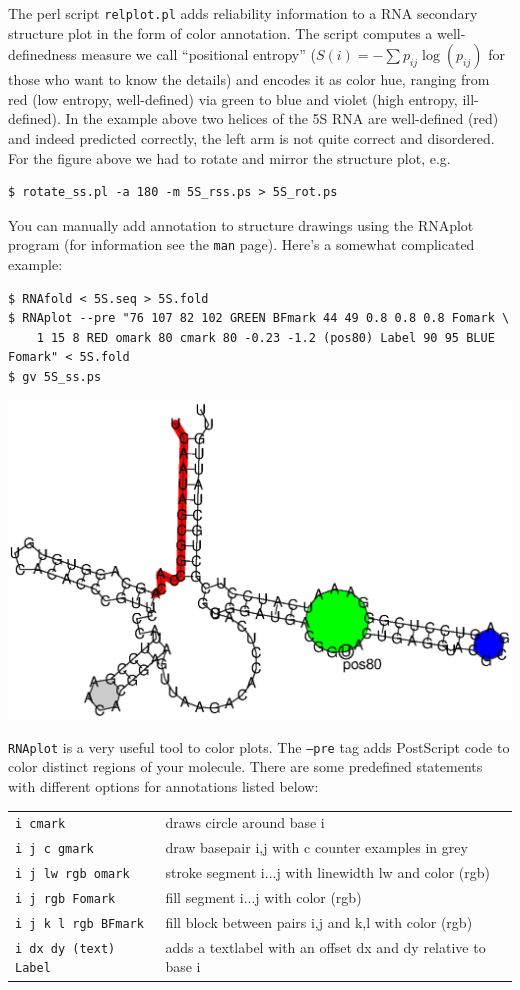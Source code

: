 \documentclass[a4paper]{article}
\begin{document}
The perl script \texttt{relplot.pl} adds reliability
information to a RNA secondary structure plot in the form of color
annotation. The script computes a well-definedness measure we call
``positional entropy'' ($S(i) = -\sum p_{ij}\log(p_{ij})$ for those who
want to know the details) and encodes it as color hue, ranging from red
(low entropy, well-defined) via green to blue and violet (high
entropy, ill-defined). In the example above two helices of the 5S RNA are
well-defined (red) and indeed predicted correctly, the left arm is not quite
correct and disordered.\\
\noindent
For the figure above we had to rotate and mirror the structure plot, e.g.
\begin{verbatim}
$ rotate_ss.pl -a 180 -m 5S_rss.ps > 5S_rot.ps
\end{verbatim}%
\noindent
You can manually add annotation to structure drawings using the RNAplot
program (for information see the \texttt{man} page). Here's a somewhat complicated example:

\begin{verbatim}
$ RNAfold < 5S.seq > 5S.fold
$ RNAplot --pre "76 107 82 102 GREEN BFmark 44 49 0.8 0.8 0.8 Fomark \
    1 15 8 RED omark 80 cmark 80 -0.23 -1.2 (pos80) Label 90 95 BLUE Fomark" < 5S.fold
$ gv 5S_ss.ps
\end{verbatim}%
\begin{center}
\includegraphics[width=.75\textwidth]{Figures/5S_ss.eps}\\
\end{center}

\texttt{RNAplot} is a very useful tool to color plots. The \texttt{--pre} tag adds 
PostScript code to color distinct regions of your molecule. There are some predefined 
statements with different options for annotations listed below:

\begin{tabular}{ll}
	\texttt{i cmark} & draws circle around base i\\
	\texttt{i j c gmark} & draw basepair i,j with c counter examples in grey\\
	\texttt{i j lw rgb omark} & stroke segment i...j with linewidth lw and color (rgb)\\
	\texttt{i j rgb Fomark} & fill segment i...j with color (rgb)\\
	\texttt{i j k l rgb BFmark} & fill block between pairs i,j and k,l with color (rgb)\\
	\texttt{i dx dy (text) Label} & adds a textlabel with an offset dx and dy relative to base i\\
\end{tabular}
\end{document}
